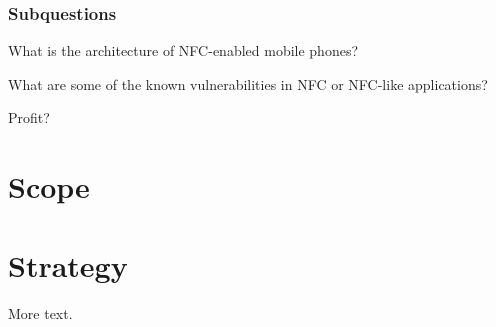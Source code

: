 \documentclass[11pt]{article} %
\begin{document}
\subsubsection{Subquestions}
\begin{center}

What is the architecture of NFC-enabled mobile phones?
\end{center}
\begin{center}
What are some of the known vulnerabilities in NFC or NFC-like applications?
\end{center}
\begin{center}
Profit?
\end{center}

\section{Scope}

\section{Strategy}
More text.
\end{document}
